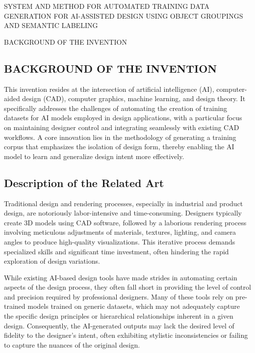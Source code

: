 \documentclass[12pt]{report}
\begin{document}
\begin{center}
SYSTEM AND METHOD FOR AUTOMATED TRAINING DATA GENERATION FOR AI-ASSISTED DESIGN USING OBJECT GROUPINGS AND SEMANTIC LABELING
\end{center}

\vspace{24pt}





\begin{center}
BACKGROUND OF THE INVENTION
\end{center}


\subsection{BACKGROUND OF THE INVENTION}

This invention resides at the intersection of artificial intelligence (AI), computer-aided design (CAD), computer graphics, machine learning, and design theory. It specifically addresses the challenges of automating the creation of training datasets for AI models employed in design applications, with a particular focus on maintaining designer control and integrating seamlessly with existing CAD workflows. A core innovation lies in the methodology of generating a training corpus that emphasizes the isolation of design form, thereby enabling the AI model to learn and generalize design intent more effectively.



\subsection{Description of the Related Art}

Traditional design and rendering processes, especially in industrial and product design, are notoriously labor-intensive and time-consuming. Designers typically create 3D models using CAD software, followed by a laborious rendering process involving meticulous adjustments of materials, textures, lighting, and camera angles to produce high-quality visualizations. This iterative process demands specialized skills and significant time investment, often hindering the rapid exploration of design variations.

While existing AI-based design tools have made strides in automating certain aspects of the design process, they often fall short in providing the level of control and precision required by professional designers. Many of these tools rely on pre-trained models trained on generic datasets, which may not adequately capture the specific design principles or hierarchical relationships inherent in a given design. Consequently, the AI-generated outputs may lack the desired level of fidelity to the designer's intent, often exhibiting stylistic inconsistencies or failing to capture the nuances of the original design.
\end{document}

